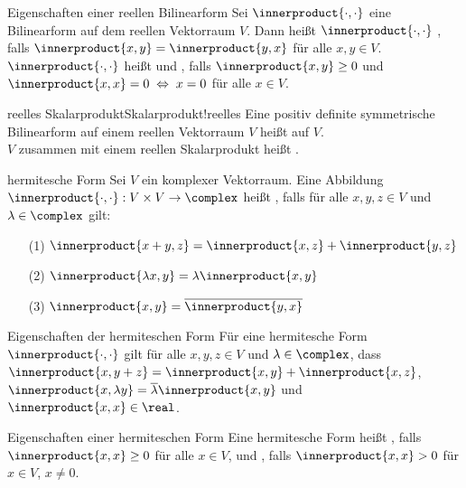 \begin{Def}{Eigenschaften einer reellen Bilinearform}
    Sei $\innerproduct{\cdot, \cdot}$ eine Bilinearform auf dem reellen Vektorraum $V$.
    Dann heißt $\innerproduct{\cdot, \cdot}$ ,
    falls $\innerproduct{x, y} = \innerproduct{y, x}$ für alle $x, y \in V$.
    $\innerproduct{\cdot, \cdot}$ heißt  und
    , falls $\innerproduct{x, y} \ge 0$ und
    $\innerproduct{x, x} = 0 \;\Leftrightarrow\; x = 0$ für alle $x \in V$.
\end{Def}

\begin{xDef}{reelles Skalarprodukt}{Skalarprodukt!reelles}
    Eine positiv definite symmetrische Bilinearform auf einem reellen
    Vektorraum $V$ heißt
     auf $V$. \\
    $V$ zusammen mit einem reellen Skalarprodukt heißt
    .
\end{xDef}

\begin{Def}{hermitesche Form}
    Sei $V$ ein komplexer Vektorraum.
    Eine Abbildung $\innerproduct{\cdot, \cdot}: V \times V \rightarrow \complex$
    heißt , falls für alle $x, y, z \in V$ und
    $\lambda \in \complex$ gilt:
    \begin{enumerate}
        \item[(1)] $\innerproduct{x + y, z} = \innerproduct{x, z} + \innerproduct{y, z}$

        \item[(2)] $\innerproduct{\lambda x, y} = \lambda \innerproduct{x, y}$

        \item[(3)] $\innerproduct{x, y} = \kk{\innerproduct{y, x}}$
    \end{enumerate}
\end{Def}

\begin{Lemma}{Eigenschaften der hermiteschen Form}
    Für eine hermitesche Form $\innerproduct{\cdot, \cdot}$ gilt für alle
    $x, y, z \in V$ und $\lambda \in \complex$, dass
    $\innerproduct{x, y + z} = \innerproduct{x, y} + \innerproduct{x, z}$,
    $\innerproduct{x, \lambda y} = \kk{\lambda} \innerproduct{x, y}$ und
    $\innerproduct{x, x} \in \real$.
\end{Lemma}

\begin{Def}{Eigenschaften einer hermiteschen Form}
    Eine hermitesche Form heißt , falls
    $\innerproduct{x, x} \ge 0$ für alle $x \in V$, und , falls
    $\innerproduct{x, x} > 0$ für $x \in V$, $x \not= 0$.
\end{Def}

